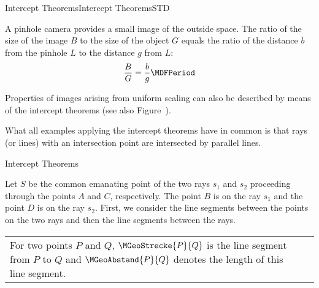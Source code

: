 \begin{MXContent}{Intercept Theorems}{Intercept Theorems}{STD}

A pinhole camera provides a small image of the outside space. The ratio 
of the size of the image $B$ to the size of the object $G$ equals 
the ratio of the distance $b$ from the pinhole $L$ to the distance $g$
from $L$:
\[
\frac{B}{G} = \frac{b}{g} \MDFPeriod %
\]

\begin{center}
\end{center}

Properties of images arising from uniform scaling can also 
be described by means of the intercept theorems (see also 
Figure~).

What all examples applying the intercept theorems have in common is that rays (or lines)
with an intersection point are intersected by parallel lines.

\begin{MXInfo}{Intercept Theorems}%
%

Let $S$ be the common emanating point of the two rays $s_1$ and $s_2$ proceeding through the points $A$ 
and $C$, respectively. The point $B$ is on the ray $s_1$ and the point $D$ is on the ray $s_2$.
First, we consider the line segments between the points on the two rays and then the line segments between 
the rays. 

\par
\begin{tabular}{@{}lr@{}}
\begin{minipage}[b]{7cm}
For two points $P$ and $Q$, $\MGeoStrecke{P}{Q}$ is the line segment 
from $P$ to $Q$ and $\MGeoAbstand{P}{Q}$ denotes the length of this line segment. 


\end{minipage}
\end{tabular}
\end{MXInfo}
\end{MXContent}
